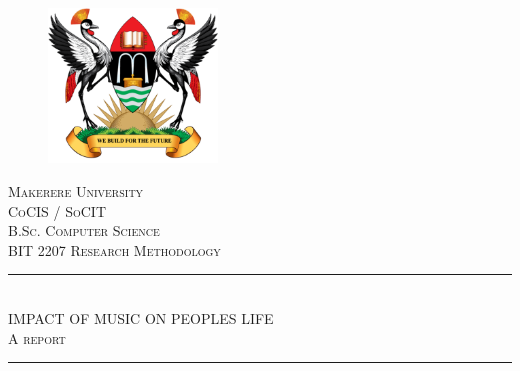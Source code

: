 \documentclass[12pt, a4paper]{report}
\begin{document}
\begin{titlepage}

\newcommand{\HRule}{\rule{\linewidth}{0.1mm}} %

\center %


\begin{figure}
    \centering
  \includegraphics[width=0.4\textwidth]{muklogo.png}
\end{figure}
 

\textsc{\LARGE Makerere University}\\[0.7cm] %
\textsc{\Large CoCIS / SoCIT}\\[0.2cm] %
\textsc{\large B.Sc. Computer Science}\\[0.1cm] %
\textsc{\small BIT 2207 Research Methodology}\\[0.8cm]


\HRule \\[0.6cm]
\textsc{\Large IMPACT OF MUSIC ON PEOPLES LIFE}\\[0.4cm]
\small{\textsc{A report}}
\HRule \\[1.0cm]
 


\end{titlepage}
\end{document}
